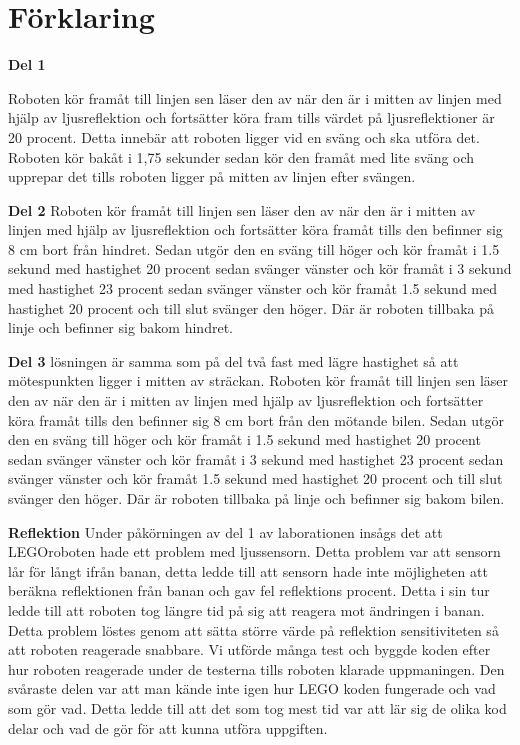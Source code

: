 \documentclass{article}
\begin{document}
\section{Förklaring}
{\setlength{\parindent}{0cm}
\textbf{Del 1}

Roboten kör framåt till linjen sen läser den av när den är i mitten av linjen med hjälp av ljusreflektion och fortsätter köra fram tills värdet på ljusreflektioner är 20 procent. Detta innebär att roboten ligger vid en sväng och ska utföra det. Roboten kör bakåt i 1,75 sekunder sedan kör den framåt med lite sväng och upprepar det tills roboten ligger på mitten av linjen efter svängen.\newline
}\newline
{\setlength{\parindent}{0cm}
\textbf{Del 2}
}\newline
Roboten kör framåt till linjen sen läser den av när den är i mitten av linjen med hjälp av ljusreflektion och fortsätter köra framåt tills den befinner sig 8 cm bort från hindret. Sedan utgör den en sväng till höger och kör framåt i 1.5 sekund med hastighet 20 procent  sedan svänger vänster och kör framåt i 3 sekund med hastighet 23 procent sedan svänger vänster och kör framåt  1.5 sekund med hastighet 20 procent och till slut svänger den höger. Där är roboten tillbaka på linje och befinner sig bakom hindret.
\newline

{\setlength{\parindent}{0cm}
\textbf{Del 3}
}\newline
lösningen är samma som på del två fast med lägre hastighet så att mötespunkten ligger i mitten av sträckan. Roboten kör framåt till linjen sen läser den av när den är i mitten av linjen med hjälp av ljusreflektion och fortsätter köra framåt tills den befinner sig 8 cm bort från den mötande bilen. Sedan utgör den en sväng till höger och kör framåt i 1.5 sekund med hastighet 20 procent  sedan svänger vänster och kör framåt i 3 sekund med hastighet 23 procent sedan svänger vänster och kör framåt 1.5 sekund med hastighet 20 procent och till slut svänger den höger. Där är roboten tillbaka på linje och befinner sig bakom bilen.\newline

{\setlength{\parindent}{0cm} \textbf{Reflektion}
}\newline
Under påkörningen av del 1 av laborationen insågs det att LEGOroboten hade ett problem med ljussensorn. Detta problem var att sensorn lår för långt ifrån banan, detta ledde till att sensorn hade inte möjligheten att beräkna reflektionen från banan och gav fel reflektions procent. Detta i sin tur ledde till att roboten tog längre tid på sig att reagera mot ändringen i banan. Detta problem löstes genom att sätta större värde på reflektion sensitiviteten så att roboten reagerade snabbare. Vi utförde många test och byggde koden efter hur roboten reagerade under de testerna tills roboten klarade uppmaningen. Den svåraste delen var att man kände inte igen hur LEGO koden fungerade och vad som gör vad. Detta ledde till att  det som tog mest tid var att lär sig de olika kod delar och vad de gör för att kunna utföra uppgiften.     
\end{document}
